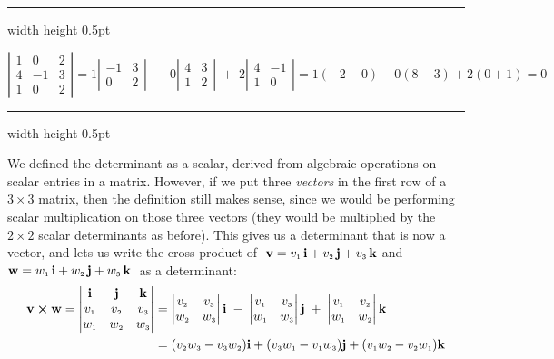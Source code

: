 \vspace{3mm}
\hrule width \textwidth height 0.5pt
\begin{exmp}
 \begin{displaymath}
  \left|
  \begin{array}{rrr}
   1 & 0 & 2\\
   4 & -1 & 3\\
   1 & 0 & 2
  \end{array}\right|
  = 1 \left|\begin{array}{rr} -1 & 3 \\ 0 & 2 \end{array}\right| \;-\;
  0 \left|\begin{array}{rr} 4 & 3 \\ 1 & 2 \end{array}\right| \;+\;
  2 \left|\begin{array}{rr} 4 & -1 \\ 1 & 0 \end{array}\right|
  = 1(-2 - 0) - 0(8 - 3) + 2(0 + 1) = 0
 \end{displaymath}
\end{exmp}
\hrule width \textwidth height 0.5pt
\newpage

We defined the determinant as a scalar, derived from algebraic operations on scalar entries in a matrix. However,
if we put three \emph{vectors} in the first row of a $3 \times 3$ matrix, then the definition still
makes sense, since we would be performing scalar multiplication on those three vectors (they would be multiplied by
the $2 \times 2$ scalar determinants as before). This gives us a determinant that is now a vector, and lets us write the
cross product of $\;\textbf{v} = v_{\scriptscriptstyle 1}\,\textbf{i} + v_{\scriptscriptstyle 2}\,\textbf{j} + v_{\scriptscriptstyle 3}\,\textbf{k}$ and $\textbf{w} = w_{\scriptscriptstyle 1}\,\textbf{i} + w_{\scriptscriptstyle 2}\,\textbf{j} + w_{\scriptscriptstyle 3}\,\textbf{k}\;$ as a determinant:
\begin{align*}
 \textbf{v} \bm{\times} \textbf{w} =
 \begin{vmatrix}
  \textbf{i} & \textbf{j} & \textbf{k} \\ v_{\scriptscriptstyle 1} & v_{\scriptscriptstyle 2} & v_{\scriptscriptstyle 3} \\
  w_{\scriptscriptstyle 1} & w_{\scriptscriptstyle 2} & w_{\scriptscriptstyle 3}
 \end{vmatrix} &= \begin{vmatrix} v_{\scriptscriptstyle 2} & v_{\scriptscriptstyle 3} \\ w_{\scriptscriptstyle 2} & w_{\scriptscriptstyle 3} \end{vmatrix} \textbf{i} \;-\;
 \begin{vmatrix} v_{\scriptscriptstyle 1} & v_{\scriptscriptstyle 3} \\ w_{\scriptscriptstyle 1} & w_{\scriptscriptstyle 3} \end{vmatrix} \textbf{j} \;+\;
 \begin{vmatrix} v_{\scriptscriptstyle 1} & v_{\scriptscriptstyle 2} \\ w_{\scriptscriptstyle 1} & w_{\scriptscriptstyle 2} \end{vmatrix} \textbf{k}\\
 &= (v_{\scriptscriptstyle 2}w_{\scriptscriptstyle 3} -
v_{\scriptscriptstyle 3}w_{\scriptscriptstyle 2})\textbf{i} + (v_{\scriptscriptstyle 3}w_{\scriptscriptstyle 1} - v_{\scriptscriptstyle 1}w_{\scriptscriptstyle 3})\textbf{j} +
(v_{\scriptscriptstyle 1}w_{\scriptscriptstyle 2} - v_{\scriptscriptstyle 2}w_{\scriptscriptstyle 1})\textbf{k}
\end{align*}

